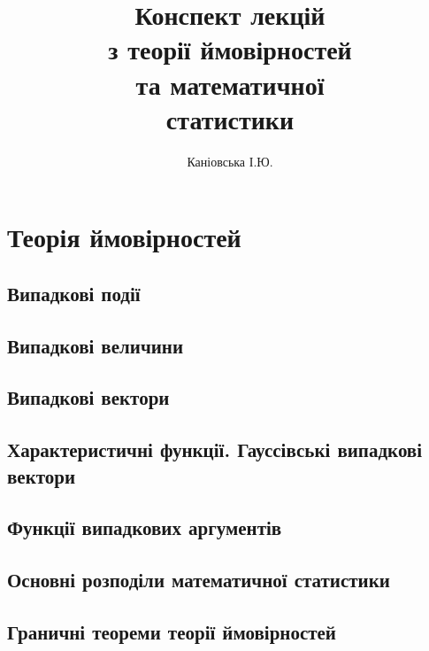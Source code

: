 \documentclass{report}
\author{\Huge Каніовська І.Ю.}
\title{
    \textbf{\fontsize{40}{48}\selectfont Конспект лекцій \\з теорії ймовірностей \\та математичної \\\vspace{0.64em}статистики}
    }
\date{}
\begin{document}
 
    \maketitle
    \setcounter{page}{2}
    \tableofcontents
    \part{Теорія ймовірностей}
    \chapter{Випадкові події}
        
        
        
        
    \chapter{Випадкові величини}
        
        
        
    \chapter{Випадкові вектори}
        
        
        
        
    \chapter{Характеристичні функції. Гауссівські випадкові вектори}
         
        
    \chapter{Функції випадкових аргументів}
        
        
        
    \chapter{Основні розподіли математичної статистики}
        
    \chapter{Граничні теореми теорії ймовірностей}\label{ch:limit_theorems}
        
        
        
        
        
\end{document}
